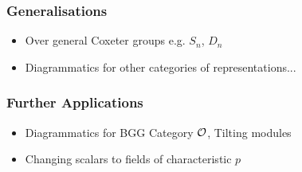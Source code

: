 \begin{frame}
    \frametitle{Generalisations}

    \begin{itemize}
        \item Over general Coxeter groups e.g. $S_n$, $D_n$
        \item Diagrammatics for other categories of representations...
    \end{itemize}
\end{frame}


\begin{frame}
    \frametitle{Further Applications}

    \begin{itemize}
        \item Diagrammatics for BGG Category $\mathcal{O}$, Tilting modules
        \item Changing scalars to fields of characteristic $p$
    \end{itemize}
\end{frame}

